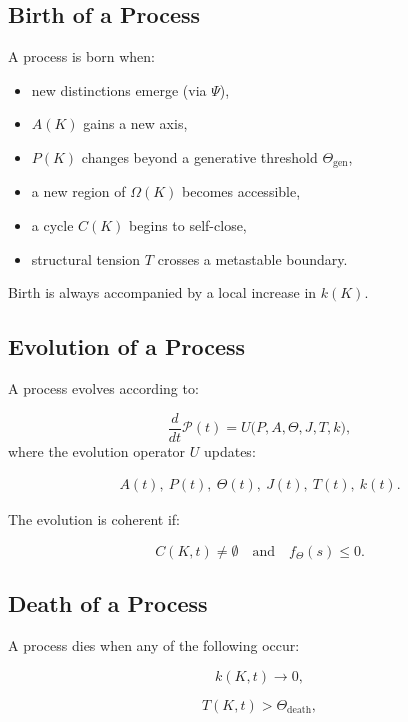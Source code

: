\subsection{Birth of a Process}

A process is born when:

\begin{itemize}
    \item new distinctions emerge (via $\Psi$),
    \item $A(K)$ gains a new axis,
    \item $P(K)$ changes beyond a generative threshold $\Theta_{\mathrm{gen}}$,
    \item a new region of $\Omega(K)$ becomes accessible,
    \item a cycle $C(K)$ begins to self-close,
    \item structural tension $T$ crosses a metastable boundary.
\end{itemize}

Birth is always accompanied by a local increase in $k(K)$.

\subsection{Evolution of a Process}

A process evolves according to:

\[
\frac{d}{dt}\mathcal{P}(t)
= U\bigl(P, A, \Theta, J, T, k\bigr),
\]
where the evolution operator $U$ updates:

\begin{align*}
A(t),\
P(t),\
\Theta(t),\
J(t),\
T(t),\
k(t).
\end{align*}

The evolution is coherent if:

\[
C(K,t) \neq \emptyset
\quad\text{and}\quad
f_{\Theta}(s) \le 0.
\]

\subsection{Death of a Process}

A process dies when any of the following occur:

\[
k(K,t) \to 0,
\]

\[
T(K,t) > \Theta_{\mathrm{death}},
\]

